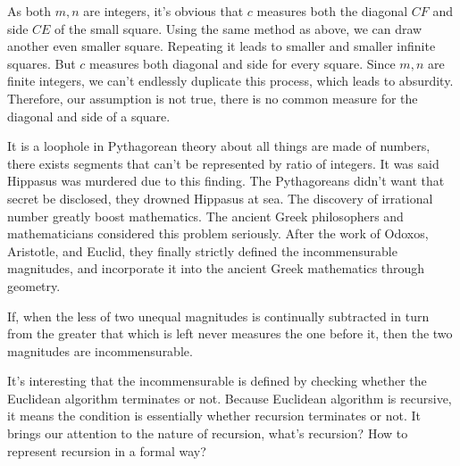 \documentclass{article}
\begin{document}
As both $m, n$ are integers, it's obvious that $c$ measures both the diagonal $CF$ and side $CE$ of the small square. Using the same method as above, we can draw another even smaller square. Repeating it leads to smaller and smaller infinite squares. But $c$ measures both diagonal and side for every square. Since $m, n$ are finite integers, we can't endlessly duplicate this process, which leads to absurdity. Therefore, our assumption is not true, there is no common measure for the diagonal and side of a square.

It is a loophole in Pythagorean theory about all things are made of numbers, there exists segments that can't be represented by ratio of integers. It was said Hippasus was murdered due to this finding. The Pythagoreans didn't want that secret be disclosed, they drowned Hippasus at sea. The discovery of irrational number greatly boost mathematics. The ancient Greek philosophers and mathematicians considered this problem seriously. After the work of Odoxos, Aristotle, and Euclid, they finally strictly defined the incommensurable magnitudes, and incorporate it into the ancient Greek mathematics through geometry.

\begin{proposition}
If, when the less of two unequal magnitudes is continually subtracted in turn from the greater that which is left never measures the one before it, then the two magnitudes are incommensurable.
\end{proposition}

It's interesting that the incommensurable is defined by checking whether the Euclidean algorithm terminates or not. Because Euclidean algorithm is recursive, it means the condition is essentially whether recursion terminates or not. It brings our attention to the nature of recursion, what's recursion? How to represent recursion in a formal way?
\end{document}

